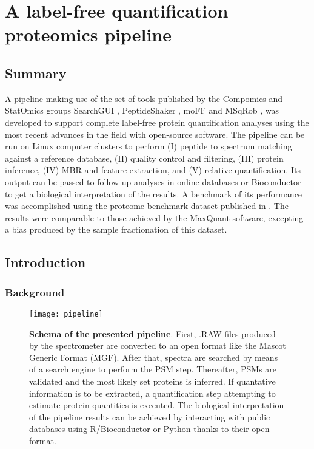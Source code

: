 \chapter{A label-free quantification proteomics pipeline}
\label{chap:pipeline}


\section*{Summary}

A pipeline making use of the set of tools published by the Compomics  and StatOmics groups SearchGUI \cite{Barsnes2018}, PeptideShaker \cite{Vaudel2015}, moFF \cite{Argentini2016} and MSqRob \cite{Goeminne2016}, was developed to support complete label-free protein quantification analyses using the most recent advances in the field with open-source software. The pipeline can be run on Linux computer clusters to perform (I) peptide to spectrum matching against a reference database, (II) quality control and filtering, (III) protein inference, (IV) \ac{MBR} and feature extraction, and (V) relative quantification. Its output can be passed to follow-up analyses in online databases or Bioconductor to get a biological interpretation of the results.  A benchmark of its performance was accomplished using the proteome benchmark dataset published in \cite{Cox2014}. The results were comparable to those achieved by the MaxQuant \cite{Cox2014} software, excepting a bias produced by the sample fractionation of this dataset.


\section{Introduction}

\subsection{Background}

\begin{figure}[!h]
\texttt{[image: pipeline]}
\caption[Schema of the presented pipeline]{\textbf{Schema of the presented pipeline}. First, .RAW files produced by the spectrometer are converted to an open format like the Mascot Generic Format (\ac{MGF}). After that, spectra are searched by means of a search engine to perform the PSM step. Thereafter, PSMs are validated and the most likely set proteins is inferred. If quantative information is to be extracted, a quantification step attempting to estimate protein quantities is executed. The biological interpretation of the pipeline results can be achieved by interacting with public databases using R/Bioconductor or Python thanks to their open format.}
\label{fig:pipeline}
\end{figure}


